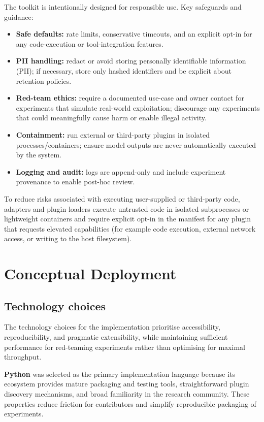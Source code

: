 The toolkit is intentionally designed for responsible use.
Key safeguards and guidance:
\begin{itemize}
  \item \textbf{Safe defaults:} rate limits, conservative timeouts, and an explicit opt-in for any code-execution or tool-integration features.
  \item \textbf{PII handling:} redact or avoid storing personally identifiable information (PII); if necessary, store only hashed identifiers and be explicit about retention policies.
  \item \textbf{Red-team ethics:} require a documented use-case and owner contact for experiments that simulate real-world exploitation; discourage any experiments that could meaningfully cause harm or enable illegal activity.
  \item \textbf{Containment:} run external or third-party plugins in isolated processes/containers; ensure model outputs are never automatically executed by the system.
  \item \textbf{Logging and audit:} logs are append-only and include experiment provenance to enable post-hoc review.
\end{itemize}

To reduce risks associated with executing user-supplied or third-party code, adapters and plugin loaders execute untrusted code in isolated subprocesses or lightweight containers and require explicit opt-in in the manifest for any plugin that requests elevated capabilities (for example code execution, external network access, or writing to the host filesystem).

\section{Conceptual Deployment}\label{sec:conceptual-deployment}

\subsection{Technology choices}\label{subsec:technology-choices}

The technology choices for the implementation prioritise accessibility, reproducibility, and pragmatic extensibility, while maintaining sufficient performance for red-teaming experiments rather than optimising for maximal throughput.

\textbf{Python} was selected as the primary implementation language because its ecosystem provides mature packaging and testing tools, straightforward plugin discovery mechanisms, and broad familiarity in the research community.
These properties reduce friction for contributors and simplify reproducible packaging of experiments.

